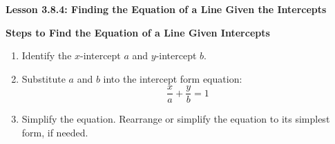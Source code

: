  \begin{center}
\textbf{Lesson 3.8.4: Finding the Equation of a Line Given the Intercepts}
\end{center}

\vspace*{1ex}

\noindent\textbf{Steps to Find the Equation of a Line Given Intercepts}

\begin{enumerate}
    \item Identify the $x$-intercept $a$ and $y$-intercept $ b $.
    \item Substitute $a$ and $b$ into the intercept form equation:
    \[
    \frac{x}{a} + \frac{y}{b} = 1
    \]
    \item Simplify the equation. Rearrange or simplify the equation to its simplest form, if needed.
\end{enumerate}



